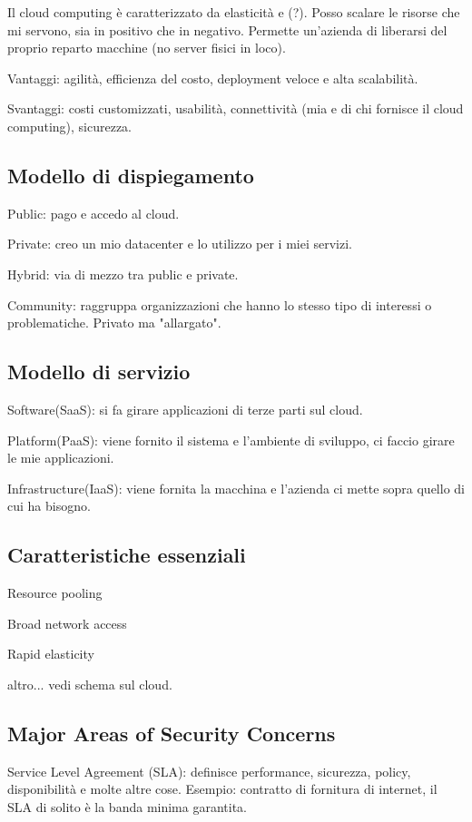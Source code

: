 Il cloud computing è caratterizzato da elasticità e (?). Posso scalare le 
risorse che mi servono, sia in positivo che in negativo. Permette un'azienda di 
liberarsi del proprio reparto macchine (no server fisici in loco).

Vantaggi: agilità, efficienza del costo, deployment veloce e alta scalabilità.

Svantaggi: costi customizzati, usabilità, connettività (mia e di chi fornisce 
il cloud computing), sicurezza.

\subsection{Modello di dispiegamento}

Public: pago e accedo al cloud.

Private: creo un mio datacenter e lo utilizzo per i miei servizi.

Hybrid: via di mezzo tra public e private.

Community: raggruppa organizzazioni che hanno lo stesso tipo di interessi o 
problematiche. Privato ma "allargato".

\subsection{Modello di servizio}

Software(SaaS): si fa girare applicazioni di terze parti sul cloud.

Platform(PaaS): viene fornito il sistema e l'ambiente di sviluppo, ci faccio 
girare le mie applicazioni. 

Infrastructure(IaaS): viene fornita la macchina e l'azienda ci mette sopra 
quello di cui ha bisogno.

\subsection{Caratteristiche essenziali}

Resource pooling

Broad network access

Rapid elasticity

altro... vedi schema sul cloud.

\subsection{Major Areas of Security Concerns}

Service Level Agreement (SLA): definisce performance, sicurezza, policy, 
disponibilità e molte altre cose. Esempio: contratto di fornitura di internet, 
il SLA di solito è la banda minima garantita.

